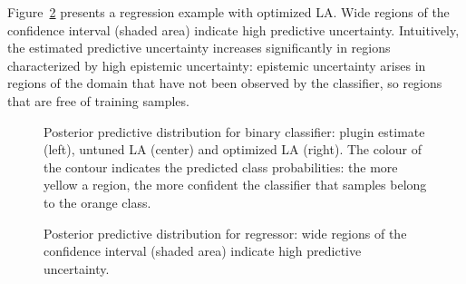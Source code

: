 \documentclass{juliacon}
\begin{document}
Figure~\ref{fig-reg} presents a regression example with optimized LA.
Wide regions of the confidence interval (shaded area) indicate high
predictive uncertainty. Intuitively, the estimated predictive
uncertainty increases significantly in regions characterized by high
epistemic uncertainty: epistemic uncertainty arises in regions of the
domain that have not been observed by the classifier, so regions that
are free of training samples.

\begin{figure}


\caption{\label{fig-class}Posterior predictive distribution for binary
classifier: plugin estimate (left), untuned LA (center) and optimized LA
(right). The colour of the contour indicates the predicted class
probabilities: the more yellow a region, the more confident the
classifier that samples belong to the orange class.}

\end{figure}%

\begin{figure}


\caption{\label{fig-reg}Posterior predictive distribution for regressor:
wide regions of the confidence interval (shaded area) indicate high
predictive uncertainty.}

\end{figure}%
\end{document}
